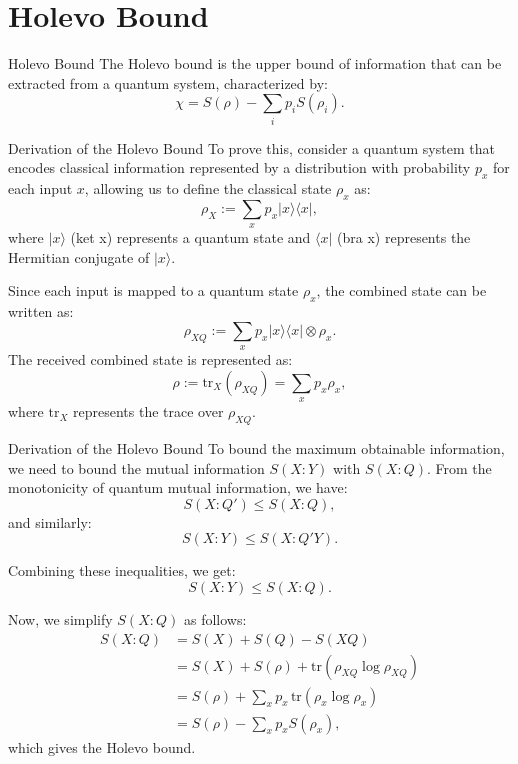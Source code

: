 \section{Holevo Bound}

\begin{frame}{Holevo Bound}
The Holevo bound is the upper bound of information that can be extracted from a quantum system, characterized by:
\[
\chi = S(\rho) - \sum_i p_i S(\rho_i).
\]
\end{frame}

\begin{frame}{Derivation of the Holevo Bound}
To prove this, consider a quantum system that encodes classical information represented by a distribution with probability \( p_x \) for each input \( x \), allowing us to define the classical state \( \rho_x \) as:
\[
\rho_X := \sum_x p_x |x\rangle \langle x|,
\]
where \( |x\rangle \) (ket x) represents a quantum state and \( \langle x| \) (bra x) represents the Hermitian conjugate of \( |x\rangle \).

Since each input is mapped to a quantum state \( \rho_x \), the combined state can be written as:
\[
\rho_{XQ} := \sum_x p_x |x\rangle \langle x| \otimes \rho_x.
\]
The received combined state is represented as:
\[
\rho := \text{tr}_X(\rho_{XQ}) = \sum_x p_x \rho_x,
\]
where \( \text{tr}_X \) represents the trace over \( \rho_{XQ} \).
\end{frame}

\begin{frame}{Derivation of the Holevo Bound}
To bound the maximum obtainable information, we need to bound the mutual information \( S(X : Y) \) with \( S(X : Q) \). From the monotonicity of quantum mutual information, we have:
\[
S(X : Q') \leq S(X : Q),
\]
and similarly:
\[
S(X : Y) \leq S(X : Q'Y).
\]

Combining these inequalities, we get:
\[
S(X : Y) \leq S(X : Q).
\]

Now, we simplify \( S(X : Q) \) as follows:
\begin{align*}
S(X : Q) &= S(X) + S(Q) - S(XQ) \\
         &= S(X) + S(\rho) + \text{tr}(\rho_{XQ} \log \rho_{XQ}) \\
         &= S(\rho) + \sum_x p_x \, \text{tr}(\rho_x \log \rho_x) \\
         &= S(\rho) - \sum_x p_x S(\rho_x),
\end{align*}
which gives the Holevo bound.
\end{frame}
